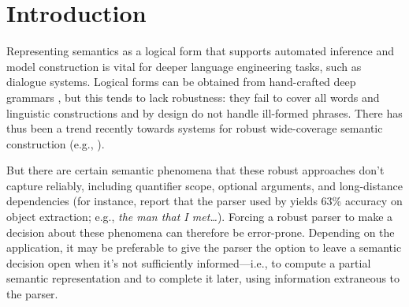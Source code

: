 \section{Introduction} \label{sec:intro}

Representing semantics as a logical form that supports automated
inference and model construction is vital for deeper language
engineering tasks, such as dialogue systems.  Logical forms
can be obtained from hand-crafted deep grammars
\cite{butt:etal:1999,copestake:flickinger:2000}, but this
tends to lack robustness: they fail to cover all
words and linguistic constructions and by design do not handle
ill-formed phrases. 
There has thus been a trend recently towards systems for
robust wide-coverage semantic construction (e.g., 
\cite{bos:etal:2004,zettlemoyer:collins:2007}).     
% 

But there are certain semantic phenomena that these robust
approaches don't capture reliably, including quantifier scope,
optional arguments, and long-distance dependencies (for instance,
 report that the parser used by
 yields 63\% accuracy on object
extraction; e.g., {\em the man that I met\dots}).  Forcing a robust
parser to make a decision about these phenomena can therefore be
error-prone.  Depending on the application, it may be preferable to
give the parser the option to leave a semantic decision open when it's not
sufficiently informed---i.e., to compute a partial semantic
representation and to complete it later, using information
extraneous to the parser.

